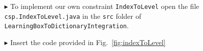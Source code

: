 

\begin{enumerate}
  \item[$\blacktriangleright$] To implement our own constraint \texttt{IndexToLevel} open the file \texttt{csp.IndexToLevel.java} in the \texttt{src} folder of \texttt{LearningBoxToDictionaryIntegration}.
  \item[$\blacktriangleright$] Insert the code provided in Fig.~\ref{fig:indexToLevel}

\end{enumerate}

